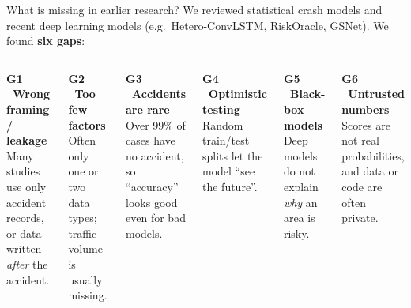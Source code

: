 \documentclass[aspectratio=169,11pt,t]{beamer}
\newcommand{\pname}{}
\newcommand{\ppart}{0}
\newcommand{\presenter}[3]{%
  \colorlet{pc}{#1}\renewcommand{\ppart}{#2}\renewcommand{\pname}{#3}}
\begin{document}
\presenter{p2}{2}{Denzel Blessing Sibanda}

\begin{frame}{What is missing in earlier research?}
\small
We reviewed statistical crash models and recent deep learning models
(e.g.\ Hetero-ConvLSTM, RiskOracle, GSNet). We found \textbf{six gaps}:
\vspace{2mm}
\begin{columns}[T,onlytextwidth]
\begin{softbox}\textbf{\color{p2}G1 \ Wrong framing / leakage}\\\footnotesize
Many studies use only accident records, or data written \emph{after} the accident.
\end{softbox}
\begin{softbox}\textbf{\color{p2}G2 \ Too few factors}\\\footnotesize
Often only one or two data types; traffic volume is usually missing.
\end{softbox}
\begin{softbox}\textbf{\color{p2}G3 \ Accidents are rare}\\\footnotesize
Over 99\% of cases have no accident, so ``accuracy'' looks good even for bad models.
\end{softbox}
\begin{softbox}\textbf{\color{p2}G4 \ Optimistic testing}\\\footnotesize
Random train/test splits let the model ``see the future''.
\end{softbox}
\begin{softbox}\textbf{\color{p2}G5 \ Black-box models}\\\footnotesize
Deep models do not explain \emph{why} an area is risky.
\end{softbox}
\begin{softbox}\textbf{\color{p2}G6 \ Untrusted numbers}\\\footnotesize
Scores are not real probabilities, and data or code are often private.
\end{softbox}
\end{columns}
\end{frame}
\end{document}
